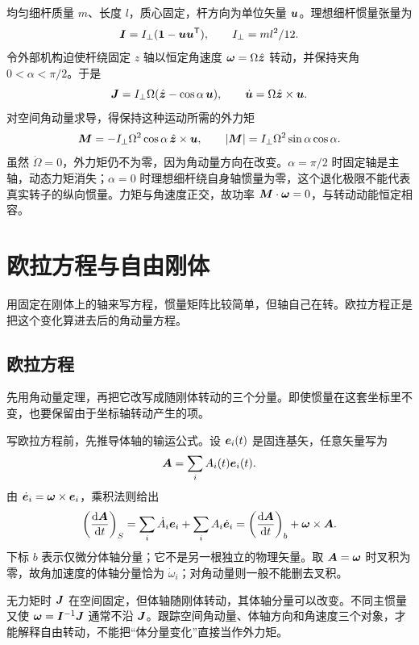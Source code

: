 \begin{example}[角速度与角动量不平行的直接后果]
均匀细杆质量 $m$、长度 $l$，质心固定，杆方向为单位矢量 $\boldsymbol{u}$。理想细杆惯量张量为
\[
\boldsymbol{I}=I_\perp(\mathbf1-\boldsymbol{u}\boldsymbol{u}^{\mathsf T}),\qquad I_\perp=ml^2/12.
\]
令外部机构迫使杆绕固定 $z$ 轴以恒定角速度 $\boldsymbol{\omega}=\Omega\hat{\boldsymbol z}$ 转动，并保持夹角 $0<\alpha<\pi/2$。于是
\[
\boldsymbol{J}=I_\perp\Omega(\hat{\boldsymbol z}-\cos\alpha\,\boldsymbol{u}),
\qquad \dot{\boldsymbol{u}}=\Omega\hat{\boldsymbol z}\times\boldsymbol{u}.
\]
对空间角动量求导，得保持这种运动所需的外力矩
\[
\boldsymbol{M}=-I_\perp\Omega^2\cos\alpha\,
\hat{\boldsymbol z}\times\boldsymbol{u},
\qquad |\boldsymbol{M}|=I_\perp\Omega^2\sin\alpha\cos\alpha.
\]
虽然 $\dot\Omega=0$，外力矩仍不为零，因为角动量方向在改变。$\alpha=\pi/2$ 时固定轴是主轴，动态力矩消失；$\alpha=0$ 时理想细杆绕自身轴惯量为零，这个退化极限不能代表真实转子的纵向惯量。力矩与角速度正交，故功率 $\boldsymbol{M}\cdot\boldsymbol{\omega}=0$，与转动动能恒定相容。
\end{example}



\section{欧拉方程与自由刚体}

用固定在刚体上的轴来写方程，惯量矩阵比较简单，但轴自己在转。欧拉方程正是把这个变化算进去后的角动量方程。

\subsection{欧拉方程}

先用角动量定理，再把它改写成随刚体转动的三个分量。即使惯量在这套坐标里不变，也要保留由于坐标轴转动产生的项。

写欧拉方程前，先推导体轴的输运公式。设 $\boldsymbol{e}_i(t)$ 是固连基矢，任意矢量写为
\[\boldsymbol{A}=\sum_i A_i(t)\boldsymbol{e}_i(t).\]
由 $\dot{\boldsymbol{e}}_i=\boldsymbol{\omega}\times\boldsymbol{e}_i$，乘积法则给出
\begin{equation}
\left(\frac{\mathrm{d}\boldsymbol{A}}{\mathrm{d} t}\right)_S
=\sum_i\dot A_i\boldsymbol{e}_i+\sum_i A_i\dot{\boldsymbol{e}}_i
=\left(\frac{\mathrm{d}\boldsymbol{A}}{\mathrm{d} t}\right)_b+\boldsymbol{\omega}\times\boldsymbol{A}.
\label{eq:rigid-transport}
\end{equation}
下标 $b$ 表示仅微分体轴分量；它不是另一根独立的物理矢量。取 $\boldsymbol{A}=\boldsymbol{\omega}$ 时叉积为零，故角加速度的体轴分量恰为 $\dot\omega_i$；对角动量则一般不能删去叉积。

\begin{physicsbox}[title={物理图像与理解：角动量不动，角速度为何会动？}]
无力矩时 $\boldsymbol{J}$ 在空间固定，但体轴随刚体转动，其体轴分量可以改变。不同主惯量又使 $\boldsymbol{\omega}=\boldsymbol{I}^{-1}\boldsymbol{J}$ 通常不沿 $\boldsymbol{J}$。跟踪空间角动量、体轴方向和角速度三个对象，才能解释自由转动，不能把“体分量变化”直接当作外力矩。
\end{physicsbox}


